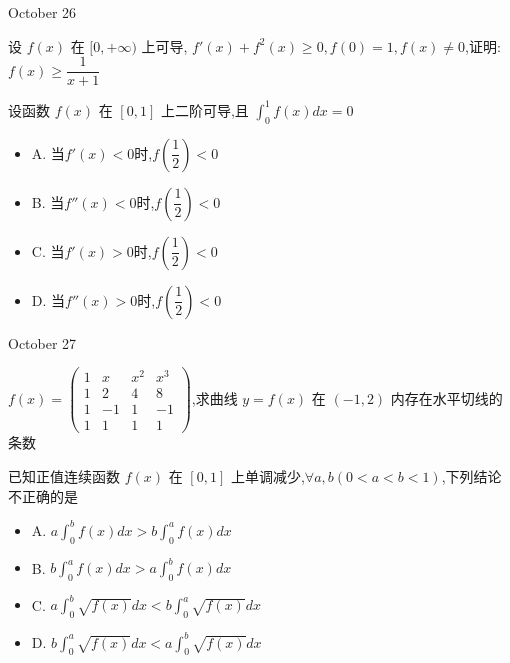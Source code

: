 \begin{solution}
	
\end{solution}


\textcolor{purplea}{October 26}

\begin{example}[][Exam: 36.4.9]
	设 $f(x)$ 在 $[0,+\infty)$ 上可导, $f'(x)+f^2(x)\geq 0,f(0)=1,f(x)\neq 0$,证明: $f(x)\geq \dfrac{1}{x+1}$
\end{example}

\begin{solution}
	
\end{solution}

\begin{example}[][Exam: 36.4.10]
	设函数 $f(x)$ 在 $[0,1]$ 上二阶可导,且 $\int_{0}^{1}f(x)dx=0$
\begin{itemize}
	\item A. 当$f'(x)<0$时,$f(\dfrac{1}{2})<0$
	\item B. 当$f''(x)<0$时,$f(\dfrac{1}{2})<0$
	\item C. 当$f'(x)>0$时,$f(\dfrac{1}{2})<0$
	\item D. 当$f''(x)>0$时,$f(\dfrac{1}{2})<0$
\end{itemize}
\end{example}

\begin{solution}
	
\end{solution}


\textcolor{purplea}{October 27}

\begin{example}[][Exam: 36.4.11]
	$f(x)=
	\begin{pmatrix}
		1&x&x^2&x^3\\
		1&2&4&8\\
		1&-1&1&-1\\
		1&1&1&1
	\end{pmatrix}$,求曲线 $y=f(x)$ 在 $(-1,2)$ 内存在水平切线的条数
\end{example}

\begin{solution}
	
\end{solution}

\begin{example}[][Exam: 36.4.12]
	已知正值连续函数 $f(x)$ 在 $[0,1]$ 上单调减少,$ \forall a,b(0<a<b<1)$,下列结论不正确的是
\begin{itemize}
	\item A. $a\int_{0}^{b}f(x)dx>b\int_{0}^{a}f(x)dx$
	\item B. $b\int_{0}^{a}f(x)dx>a\int_{0}^{b}f(x)dx$
	\item C. $a\int_{0}^{b}\sqrt{f(x)}dx<b\int_{0}^{a}\sqrt{f(x)}dx$
	\item D. $b\int_{0}^{a}\sqrt{f(x)}dx<a\int_{0}^{b}\sqrt{f(x)}dx$
\end{itemize}
\end{example}

